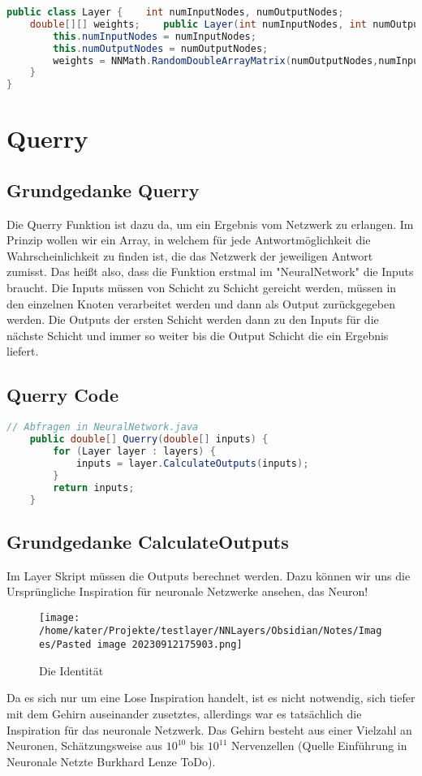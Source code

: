 \documentclass[12pt]{article}
\begin{document}
\begin{lstlisting}[language=Java]
public class Layer {    int numInputNodes, numOutputNodes;
    double[][] weights;    public Layer(int numInputNodes, int numOutputNodes) {
        this.numInputNodes = numInputNodes;
        this.numOutputNodes = numOutputNodes;
        weights = NNMath.RandomDoubleArrayMatrix(numOutputNodes,numInputNodes);
    }
}
\end{lstlisting}\section{ Querry}\subsection{ Grundgedanke Querry}Die Querry Funktion ist dazu da, um ein Ergebnis vom Netzwerk zu erlangen. Im Prinzip wollen wir ein Array, in welchem für jede Antwortmöglichkeit die Wahrscheinlichkeit zu finden ist, die das Netzwerk der jeweiligen Antwort zumisst. 
Das heißt also, dass die Funktion erstmal im "NeuralNetwork" die Inputs braucht. Die Inputs müssen von Schicht zu Schicht gereicht werden, müssen in den einzelnen Knoten verarbeitet werden und dann als Output zurückgegeben werden. Die Outputs der ersten Schicht werden dann zu den Inputs für die nächste Schicht und immer so weiter bis die Output Schicht die ein Ergebnis liefert.\subsection{ Querry Code}\begin{lstlisting}[language=Java]
// Abfragen in NeuralNetwork.java
    public double[] Querry(double[] inputs) {
        for (Layer layer : layers) {
            inputs = layer.CalculateOutputs(inputs);
        }
        return inputs;
    }
\end{lstlisting}\subsection{ Grundgedanke CalculateOutputs}Im Layer Skript müssen die Outputs berechnet werden. Dazu können wir uns die Ursprüngliche Inspiration für neuronale Netzwerke ansehen, das Neuron!
\begin{figure}[H]
\centering
\texttt{[image: /home/kater/Projekte/testlayer/NNLayers/Obsidian/Notes/Images/Pasted image 20230912175903.png]}
\caption{Die Identität}
\label{Was kommt hier rein?}
\end{figure}
Da es sich nur um eine Lose Inspiration handelt, ist es nicht notwendig, sich tiefer mit dem Gehirn auseinander zusetztes, allerdings war es tatsächlich die Inspiration für das neuronale Netzwerk. Das Gehirn besteht aus einer Vielzahl an Neuronen, Schätzungsweise aus $10^{10}$ bis $10^{11}$ Nervenzellen (Quelle Einführung in Neuronale Netzte Burkhard Lenze ToDo).
\end{document}
